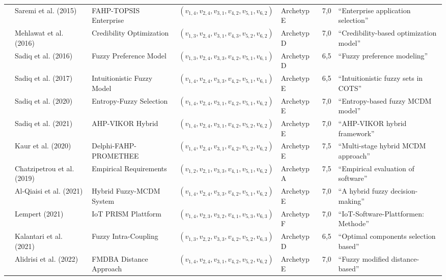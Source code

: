\begin{longtable}{p{2.0cm} p{2.6cm} p{2.8cm} p{2.7cm} p{2.2cm} p{1.0cm} p{2.5cm}}
\cite{LYMHTPXS} & Saremi et al. (2015) & FAHP-TOPSIS Enterprise & $(v_{1,4}, v_{2,4}, v_{3,1}, v_{4,2}, v_{5,1}, v_{6,2})$ & Archetyp E & 7,0 & \enquote{Enterprise application selection} \\
\cite{JX4RDRDU} & Mehlawat et al. (2016) & Credibility Optimization & $(v_{1,3}, v_{2,4}, v_{3,1}, v_{4,3}, v_{5,2}, v_{6,2})$ & Archetyp D & 7,0 & \enquote{Credibility-based optimization model} \\
\cite{P9SATBH5} & Sadiq et al. (2016) & Fuzzy Preference Model & $(v_{1,3}, v_{2,4}, v_{3,3}, v_{4,2}, v_{5,1}, v_{6,1})$ & Archetyp D & 6,5 & \enquote{Fuzzy preference modeling} \\
\cite{JT5X3FIG} & Sadiq et al. (2017) & Intuitionistic Fuzzy Model & $(v_{1,4}, v_{2,4}, v_{3,3}, v_{4,2}, v_{5,1}, v_{6,1})$ & Archetyp E & 6,5 & \enquote{Intuitionistic fuzzy sets in COTS} \\
\cite{DFASRUVC} & Sadiq et al. (2020) & Entropy-Fuzzy Selection & $(v_{1,4}, v_{2,4}, v_{3,1}, v_{4,2}, v_{5,1}, v_{6,2})$ & Archetyp E & 7,0 & \enquote{Entropy-based fuzzy MCDM model} \\
\cite{QNWK8SAP} & Sadiq et al. (2021) & AHP-VIKOR Hybrid & $(v_{1,4}, v_{2,4}, v_{3,1}, v_{4,2}, v_{5,2}, v_{6,2})$ & Archetyp E & 7,0 & \enquote{AHP-VIKOR hybrid framework} \\
\cite{NZJEEPAC} & Kaur et al. (2020) & Delphi-FAHP-PROMETHEE & $(v_{1,4}, v_{2,4}, v_{3,1}, v_{4,2}, v_{5,2}, v_{6,2})$ & Archetyp E & 7,5 & \enquote{Multi-stage hybrid MCDM approach} \\
\cite{UK2X9C4W} & Chatzipetrou et al. (2019) & Empirical Requirements & $(v_{1,2}, v_{2,1}, v_{3,3}, v_{4,1}, v_{5,1}, v_{6,2})$ & Archetyp A & 7,5 & \enquote{Empirical evaluation of software} \\
\cite{5BBYQCJB} & Al-Qiaisi et al. (2021) & Hybrid Fuzzy-MCDM System & $(v_{1,4}, v_{2,4}, v_{3,3}, v_{4,2}, v_{5,1}, v_{6,2})$ & Archetyp E & 7,0 & \enquote{A hybrid fuzzy decision-making} \\
\cite{RRU375GB} & Lempert (2021) & IoT PRISM Plattform & $(v_{1,4}, v_{2,3}, v_{3,2}, v_{4,1}, v_{5,3}, v_{6,3})$ & Archetyp F & 7,0 & \enquote{IoT-Software-Plattformen: Methode} \\
\cite{UFCEV52H} & Kalantari et al. (2021) & Fuzzy Intra-Coupling & $(v_{1,3}, v_{2,2}, v_{3,3}, v_{4,2}, v_{5,2}, v_{6,3})$ & Archetyp D & 6,5 & \enquote{Optimal components selection based} \\
\cite{FVINCQ89} & Alidrisi et al. (2022) & FMDBA Distance Approach & $(v_{1,4}, v_{2,4}, v_{3,1}, v_{4,2}, v_{5,2}, v_{6,2})$ & Archetyp E & 7,0 & \enquote{Fuzzy modified distance-based} \\

\end{longtable}
